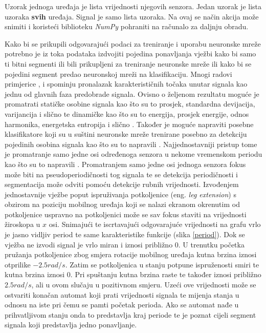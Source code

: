 \documentclass[times, utf8, diplomski]{fer}
\begin{document}
Uzorak jednoga uređaja je lista vrijednosti njegovih senzora. Jedan uzorak je lista uzoraka \textbf{svih} uređaja. Signal je samo lista uzoraka. Na ovaj se način akcija 
može snimiti i koristeći biblioteku \textit{NumPy} pohraniti na računalo za daljnju obradu.

Kako bi se prikupili odgovarajući podaci za treniranje i uporabu neuronske mreže potrebno je iz toka podataka izdvojiti pojedina ponavljanja vježbi kako bi samo ti bitni
segmenti ili bili prikupljeni za treniranje neuronske mreže ili kako bi se pojedini segment predao neuronskoj mreži na klasifikaciju. 
Mnogi radovi primjerice \cite{android}, \cite{exo} i \cite{LowerLimb} spominju pronalazak karakterističnih točaka unutar signala
kao jednu od glavnih faza predobrade signala. Ovisno o željenom rezultatu moguće je promatrati statičke osobine signala
kao što su to prosjek, standardna devijacija, varijancija i slično te dinamičke kao što su to energija, prosjek energije, odnos
harmonika, energetska entropija i slično \citep{android}. Također je moguće napraviti posebne klasifikatore koji su u suštini
neuronske mreže trenirane posebno za detekciju pojedinih osobina signala kao što su to napravili \cite{exo}. 
Najjednostavniji pristup tome je promatranje samo jedne osi određenoga senzora u nekome vremenskom periodu kao što su to napravili
\cite{LowerLimb}. Promatranjem samo jedne osi jednoga senzora fokus može biti na pseudoperiodičnosti tog signala te se detekcija
periodičnosti i segmentacija može odviti pomoću detekcije rubnih vrijednosti. Izvođenjem jednostavnije vježbe poput ispruživanja
potkoljenice (eng. \textit{leg extension}) s obzirom na poziciju mobilnog uređaja koji se nalazi ekranom okrenutim od potkoljenice uspravno na
potkoljenici može se sav fokus staviti na vrijednosti žiroskopa u $x$ osi. Snimajući te iscrtavajući odgovarajuće vrijednosti
na grafu vrlo je jasno vidljiv period te same karakteristike funkcije (slika \ref{period}). Dok se vježba ne izvodi signal je
vrlo miran i iznosi približno 0. U trenutku početka pružanja potkoljenice zbog smjera rotacije mobilnog uređaja kutna brzina iznosi
otprilike $-2.5 rad/s$. Zatim se potkoljenica u stanju potpune ispruženosti smiri te kutna brzina iznosi 0. Pri spuštanju kutna
brzina raste te također iznosi približno $2.5 rad/s$, ali u ovom slučaju u pozitivnom smjeru. Uzeći ove vrijednosti može se ostvariti
konačan automat koji prati vrijednosti signala te mijenja stanja u odnosu na iste pri čemu se pamti početak perioda. Ako se automat nađe u
prihvatljivom stanju onda to predstavlja kraj periode te je poznat cijeli segment signala koji predstavlja jedno ponavljanje.
\end{document}
